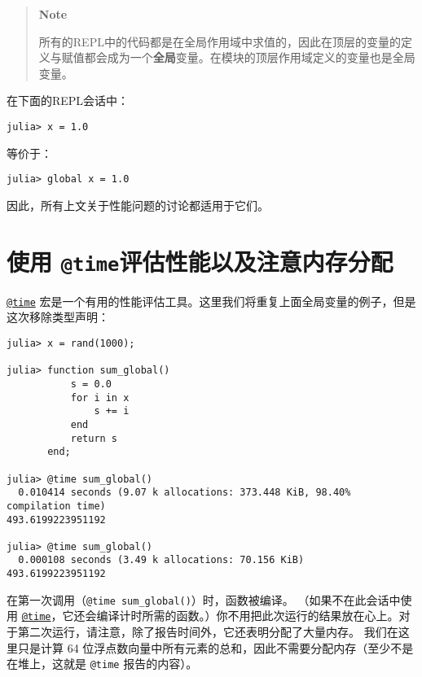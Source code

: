 \begin{quote}
\textbf{Note}

所有的REPL中的代码都是在全局作用域中求值的，因此在顶层的变量的定义与赋值都会成为一个\textbf{全局}变量。在模块的顶层作用域定义的变量也是全局变量。

\end{quote}


在下面的REPL会话中：




\begin{verbatim}
julia> x = 1.0
\end{verbatim}



等价于：




\begin{verbatim}
julia> global x = 1.0
\end{verbatim}



因此，所有上文关于性能问题的讨论都适用于它们。



\hypertarget{1547856480373223464}{}


\section{使用 \texttt{@time}评估性能以及注意内存分配}



\hyperlink{8029752041511656628}{\texttt{@time}} 宏是一个有用的性能评估工具。这里我们将重复上面全局变量的例子，但是这次移除类型声明：




\begin{verbatim}
julia> x = rand(1000);

julia> function sum_global()
           s = 0.0
           for i in x
               s += i
           end
           return s
       end;

julia> @time sum_global()
  0.010414 seconds (9.07 k allocations: 373.448 KiB, 98.40% compilation time)
493.6199223951192

julia> @time sum_global()
  0.000108 seconds (3.49 k allocations: 70.156 KiB)
493.6199223951192
\end{verbatim}



在第一次调用（\texttt{@time sum\_global()}）时，函数被编译。 （如果不在此会话中使用 \hyperlink{8029752041511656628}{\texttt{@time}}，它还会编译计时所需的函数。）你不用把此次运行的结果放在心上。对于第二次运行，请注意，除了报告时间外，它还表明分配了大量内存。 我们在这里只是计算 64 位浮点数向量中所有元素的总和，因此不需要分配内存（至少不是在堆上，这就是 \texttt{@time} 报告的内容）。



